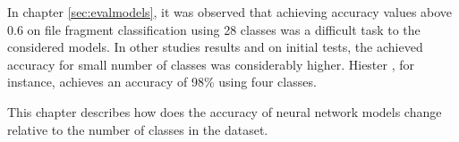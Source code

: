 In chapter \ref{sec:evalmodels}, it was observed that achieving accuracy values above 0.6 on file fragment classification using 28 classes was a difficult task to the considered models. In other studies results \cite{hiester_file_2018} \cite{sportiello_context-based_2012} \cite{amirani_feature-based_2013} \cite{maslim_distributed_2014} and on initial tests, the achieved accuracy for small number of classes was considerably higher. Hiester \cite{hiester_file_2018}, for instance, achieves an accuracy of 98\% using four classes.

This chapter describes how does the accuracy of neural network models change relative to the number of classes in the dataset.
